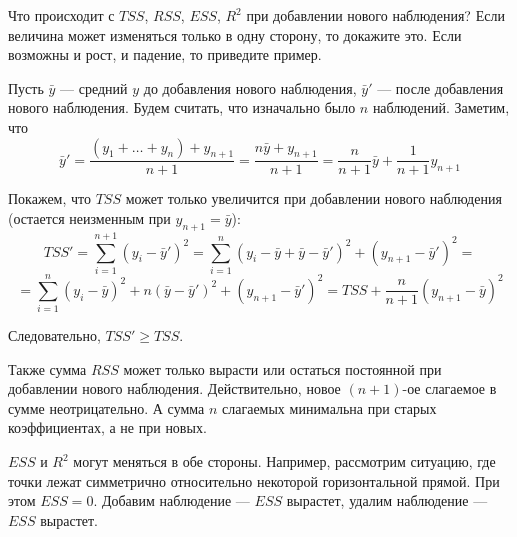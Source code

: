 \begin{problem}
Что происходит с $TSS$, $RSS$, $ESS$, $R^2$ при добавлении нового наблюдения? Если величина может изменяться только в одну сторону, то докажите это. Если возможны и рост, и падение, то приведите пример.


\begin{sol}
Пусть \(\bar{y}\) — средний \(y\) до добавления нового наблюдения, \(\bar{y}'\) — после добавления нового наблюдения. Будем считать, что изначально было \(n\) наблюдений. Заметим, что
\[\bar{y}' = \frac{(y_1 + \ldots + y_n) + y_{n+1}}{n + 1} = \frac{n \bar{y} + y_{n + 1}}{n + 1} = \frac{n}{n+ 1}\bar{y} + \frac{1}{n+1}y_{n+1}\]

Покажем, что \(TSS\) может только увеличится при добавлении нового наблюдения (остается неизменным при \(y_{n+1} = \bar{y}\)):
\[TSS'= \sum_{i = 1}^{n + 1} (y_i - \bar{y}')^2 = \sum_{i = 1}^{n} (y_i - \bar{y} + \bar{y} - \bar{y}')^2 + (y_{n + 1} - \bar{y}')^2 = \]
\[=\sum_{i = 1}^{n} (y_i - \bar{y})^2 + n(\bar{y} - \bar{y}')^2 + (y_{n + 1} - \bar{y}')^2  = TSS + \frac{n}{n+1} (y_{n+1} - \bar{y})^2\]

Следовательно, \(TSS' \geq TSS\).

Также сумма \(RSS\) может только вырасти или остаться постоянной при добавлении нового наблюдения. Действительно, новое $(n+1)$-ое слагаемое в сумме неотрицательно. А сумма $n$ слагаемых минимальна при старых коэффициентах, а не при новых.

\(ESS\) и \(R^2\) могут меняться в обе стороны. Например, рассмотрим ситуацию, где точки лежат симметрично относительно некоторой горизонтальной прямой. При этом $ESS=0$. Добавим наблюдение — $ESS$ вырастет, удалим наблюдение — $ESS$ вырастет.
\end{sol}
\end{problem}



